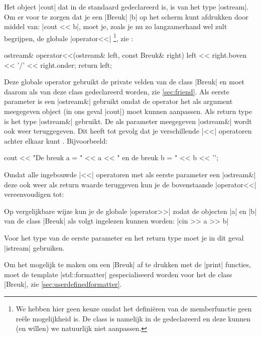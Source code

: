 \begin{cpplstShortInline}
Het object |cout| dat in de standaard  gedeclareerd is, is van het type |ostream|.
Om er voor te zorgen dat je een |Breuk| |b| op het scherm kunt afdrukken door middel van: |cout << b|, moet je, zoals je nu zo langzamerhand wel zult begrijpen, de globale |operator<<| %
\footnote{%
	We hebben hier geen keuze omdat het definiëren van de memberfunctie  geen reële mogelijkheid is.
	De class  is namelijk in de   gedeclareerd en deze  kunnen (en willen) we natuurlijk niet aanpassen.
}, zie :
\begin{cpplstfragment}
ostream& operator<<(ostream& left, const Breuk& right) {
	left << right.boven << '/' << right.onder;
	return left; 
}
\end{cpplstfragment}
Deze globale operator gebruikt de private velden van de class |Breuk| en moet daarom als  van deze class gedeclareerd worden, zie \cref{sec:friend}. 
Als eerste parameter is een |ostream&| gebruikt omdat de operator het als argument meegegeven object (in ons geval |cout|) moet kunnen aanpassen. 
Als return type is het type |ostream&| gebruikt. 
De als parameter meegegeven |ostream&| wordt ook weer teruggegeven. 
Dit heeft tot gevolg dat je verschillende |<<| operatoren achter elkaar kunt . 
Bijvoorbeeld:
\begin{cpplstfragment}
	cout << "De breuk a = " << a << " en de breuk b = " << b << '\n';
\end{cpplstfragment}

Omdat alle ingebouwde  |<<| operatoren met als eerste parameter een |ostream&| deze  ook weer als return waarde teruggeven kun je de bovenstaande |operator<<| vereenvoudigen tot:

Op vergelijkbare wijze kun je de globale |operator>>|  zodat de objecten |a| en |b| van de class |Breuk| als volgt ingelezen kunnen worden: |cin >> a >> b|

Voor het type van de eerste parameter en het return type moet je in dit geval |istream| gebruiken.

Om het mogelijk te maken om een |Breuk| af te drukken met de |print| functies, moet de template |std::formatter| gespecialiseerd worden voor het de class |Breuk|, zie \cref{sec:userdefinedformatter}.


\end{cpplstShortInline}
